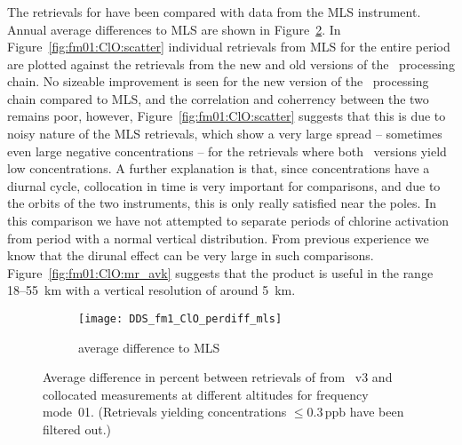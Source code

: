 
\subsubsection{}
\label{sec:fm01:comparison:ClO}
The retrievals for  have been compared with data from the MLS
instrument. Annual average differences to MLS are shown in
Figure~\ref{fig:fm01:ClO:profiles}. In Figure~\ref{fig:fm01:ClO:scatter}
individual retrievals from MLS for the entire period are plotted against the
retrievals from the new and old versions of the \smr\ processing chain. No
sizeable improvement is seen for the new version of the \smr\ processing chain
compared to MLS, and the correlation and coherrency between the two remains
poor, however, Figure~\ref{fig:fm01:ClO:scatter} suggests that this is due to
noisy nature of the MLS retrievals, which show a very large spread -- sometimes
even large negative concentrations -- for the retrievals where both \smr\
versions yield low  concentrations. A further  explanation is
that, since \chem{ClO} concentrations have a diurnal cycle, collocation in time
is very important for comparisons, and due to the orbits of the two
instruments, this is only really satisfied near the poles. In this comparison
we have not attempted to separate periods of chlorine activation from period
with a normal vertical distribution. From previous experience we know that the
dirunal effect can be very large in such comparisons.
Figure~\ref{fig:fm01:ClO:mr_avk} suggests that the product is useful in the
range 18--55~km with a vertical resolution of around 5~km.


\begin{figure}[tbhp]
    \centering
    \begin{subfigure}[b]{0.49\textwidth}
        \texttt{[image: DDS\_fm1\_ClO\_perdiff\_mls]}
        \caption{average difference to MLS}
        \label{fig:fm01:ClO:profiles:MLS}
    \end{subfigure}
    \caption{Average difference in percent between retrievals of 
    from \smr~v3 and collocated measurements at
    different altitudes for frequency mode~01. (Retrievals yielding
    concentrations $\leq 0.3\,\mathrm{ppb}$ have been filtered out.)}
    \label{fig:fm01:ClO:profiles}
\end{figure}

